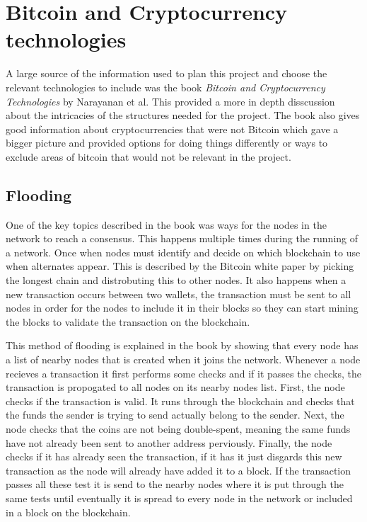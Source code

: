 \documentclass{l4proj}
\begin{document}
\section{Bitcoin and Cryptocurrency technologies}
A large source of the information used to plan this project and choose the relevant technologies to include was the
book \emph{Bitcoin and Cryptocurrency Technologies} by Narayanan et al. This provided a more in depth disscussion
about the intricacies of the structures needed for the project. The book also gives good information about cryptocurrencies
that were not Bitcoin which gave a bigger picture and provided options for doing things differently or ways to 
exclude areas of bitcoin that would not be relevant in the project.

\subsection{Flooding}
One of the key topics described in the book was ways for the nodes in the network to reach a consensus. This happens
multiple times during the running of a network. Once when nodes must identify and decide on which blockchain to use when
alternates appear. This is described by the Bitcoin white paper by picking the longest chain and distrobuting this to 
other nodes. It also happens when a new transaction occurs between two wallets, the transaction must be sent to all
nodes in order for the nodes to include it in their blocks so they can start mining the blocks to validate the transaction 
on the blockchain.

This method of flooding is explained in the book by showing that every node has a list of nearby nodes that is created
when it joins the network. Whenever a node recieves a transaction it first performs some checks and if it passes the 
checks, the transaction is propogated to all nodes on its nearby nodes list. First, the node checks if the transaction is
valid. It runs through the blockchain and checks that the funds the sender is trying to send actually belong to the sender.
Next, the node checks that the coins are not being double-spent, meaning the same funds have not already been sent to another
address perviously. Finally, the node checks if it has already seen the transaction, if it has it just disgards this new
transaction as the node will already have added it to a block. If the transaction passes all these test it is send to the
nearby nodes where it is put through the same tests until eventually it is spread to every node in the network or included
in a block on the blockchain.
\end{document}
